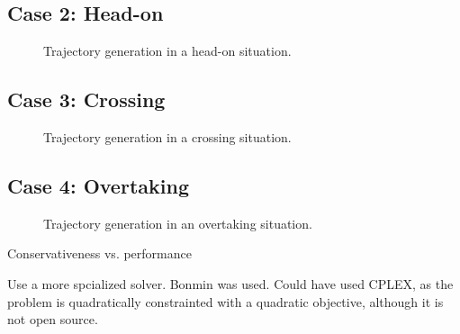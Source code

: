 \subsection{Case 2: Head-on}
\label{sec:case-2-head-on}
\begin{figure}
    \centering
    
    \caption{Trajectory generation in a head-on situation.}
    \label{fig:head-on}
\end{figure}

\subsection{Case 3: Crossing}
\label{sec:case-3-crossing}
\begin{figure}
    \centering
    
    \caption{Trajectory generation in a crossing situation.}
    \label{fig:crossing}
\end{figure}


\subsection{Case 4: Overtaking}
\label{sec:case-4-overtaking}
\begin{figure}
    \centering
    
    \caption{Trajectory generation in an overtaking situation.}
    \label{fig:overtaking}
\end{figure}

Conservativeness vs. performance

Use a more spcialized solver. Bonmin was used. Could have used CPLEX, as the problem is quadratically constrainted with a quadratic objective, although it is not open source. 